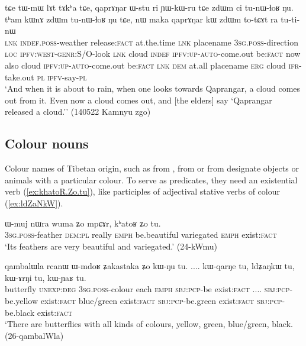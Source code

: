 \begin{exe}
\ex \label{ex:qaprANar.kW}
\gll tɕe tɯ-mɯ lɤt tɤkʰa tɕe, qaprɤŋar ɯ-stu ri ɲɯ-kɯ-ru tɕe zdɯm ci tu-nɯ-ɬoʁ ŋu. tʰam kɯnɤ zdɯm tu-nɯ-ɬoʁ ŋu tɕe, nɯ maka qaprɤŋar kɯ zdɯm to-tɕɤt ra tu-ti-nɯ \\
\textsc{lnk} \textsc{indef}.\textsc{poss}-weather release:\textsc{fact} at.the.time \textsc{lnk} placename \textsc{3sg}.\textsc{poss}-direction \textsc{loc} \textsc{ipfv}:\textsc{west}-\textsc{genr}:S/O-look \textsc{lnk} cloud \textsc{indef} \textsc{ipfv}:\textsc{up}-\textsc{auto}-come.out be:\textsc{fact} now also cloud \textsc{ipfv}:\textsc{up}-\textsc{auto}-come.out be:\textsc{fact} \textsc{lnk} \textsc{dem} at.all placename \textsc{erg} cloud \textsc{ifr}-take.out \textsc{pl} \textsc{ipfv}-say-\textsc{pl} \\
\glt `And when it is about to rain, when one looks towards Qaprangar, a cloud comes out from it. Even now a cloud comes out, and [the elders] say `Qaprangar released a cloud.'' (140522 Kamnyu zgo) 
\end{exe}

\subsection{Colour nouns} \label{sec:tibetan.colours}
Colour names of Tibetan origin, such as  from ,  from  or  from  designate objects or animals with a particular colour. To serve as predicates, they need an existential verb (\ref{ex:khatoR.Zo.tu}), like participles of adjectival stative verbs of colour (\ref{ex:ldZaNkW}). 

\begin{exe}
\ex \label{ex:khatoR.Zo.tu}
 \gll ɯ-muj nɯra wuma ʑo mpɕɤr, kʰatoʁ ʑo tu. \\
 \textsc{3sg}.\textsc{poss}-feather \textsc{dem}:\textsc{pl} really \textsc{emph} be.beautiful variegated \textsc{emph} exist:\textsc{fact} \\
 \glt `Its feathers are very beautiful and variegated.' (24-kWmu)
\end{exe}


\begin{exe}
\ex \label{ex:ldZaNkW}
 \gll qambalɯla rcanɯ ɯ-mdoʁ ʑakastaka ʑo kɯ-ŋu tu. .... kɯ-qarŋe tu, ldʑaŋkɯ tu, kɯ-ɤrŋi tu, kɯ-ɲaʁ tu. \\
 butterfly \textsc{unexp}:\textsc{deg} \textsc{3sg}.\textsc{poss}-colour each \textsc{emph} \textsc{sbj}:\textsc{pcp}-be exist:\textsc{fact} .... \textsc{sbj}:\textsc{pcp}-be.yellow exist:\textsc{fact} blue/green exist:\textsc{fact} \textsc{sbj}:\textsc{pcp}-be.green exist:\textsc{fact} \textsc{sbj}:\textsc{pcp}-be.black exist:\textsc{fact}\\
 \glt `There are butterflies with all kinds of colours, yellow, green, blue/green, black. (26-qambalWla)
\end{exe}

